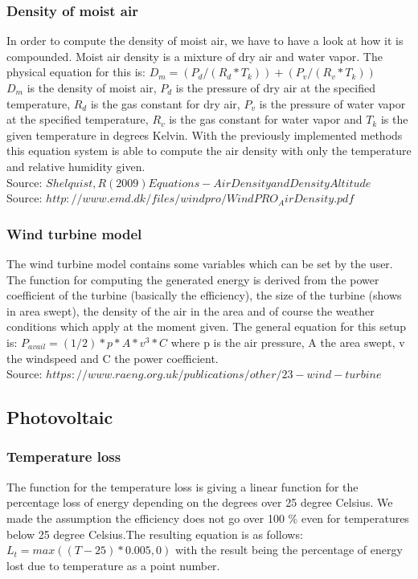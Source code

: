 \subsubsection{Density of moist air}
In order to compute the density of moist air, we have to have a look at how it is compounded. Moist air density is a mixture of dry air and water vapor. The physical equation for this is: $D_m = (P_d/(R_d * T_k))+(P_v/(R_v*T_k))$\\
$D_m$ is the density of moist air, $P_d$ is the pressure of dry air at the specified temperature, $R_d$ is the gas constant for dry air, $P_v$ is the pressure of water vapor at the specified temperature, $R_v$ is the gas constant for water vapor and $T_k$ is the given temperature in degrees Kelvin. With the previously implemented methods this equation system is able to compute the air density with only the temperature and relative humidity given.\\
Source: $Shelquist, R (2009) Equations - Air Density and Density Altitude$\\
Source: $http://www.emd.dk/files/windpro/WindPRO_AirDensity.pdf$
\subsubsection{Wind turbine model}
The wind turbine model contains some variables which can be set by the user. The function for computing the generated energy is derived from the power coefficient of the turbine (basically the efficiency), the size of the turbine (shows in area swept), the density of the air in the area and of course the weather conditions which apply at the moment given.
The general equation for this setup is: $P_{avail} = (1/2) * p * A * v^{3} * C$
where p is the air pressure, A the area swept, v the windspeed and C the power coefficient.\\
Source: $https://www.raeng.org.uk/publications/other/23-wind-turbine$
\subsection{Photovoltaic}
\subsubsection{Temperature loss}
The function for the temperature loss is giving a linear function for the percentage loss of energy depending on the degrees over 25 degree Celsius. We made the assumption the efficiency does not go over 100 \% even for temperatures below 25 degree Celsius.The resulting equation is as follows: $L_t = max((T-25)*0.005 , 0)$ with the result being the percentage of energy lost due to temperature as a point number.
